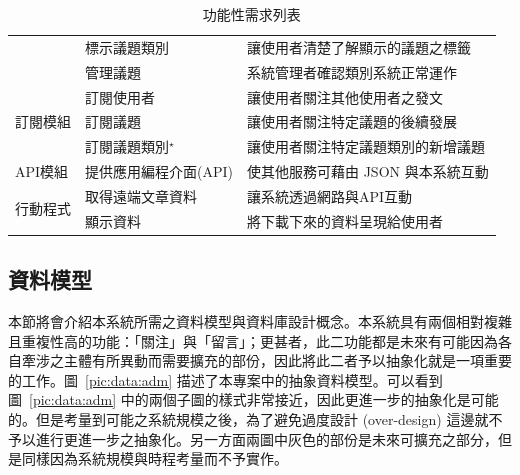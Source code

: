 \documentclass[12pt]{article}
\begin{document}
\begin{table}[t]
\begin{tabular}{ | l | l | l | }
& 標示議題類別 & 讓使用者清楚了解顯示的議題之標籤 \\
& 管理議題 & 系統管理者確認類別系統正常運作 \\ \hline
\multirow{3}{*}{訂閱模組}
& 訂閱使用者 & 讓使用者關注其他使用者之發文 \\
& 訂閱議題 & 讓使用者關注特定議題的後續發展 \\
& 訂閱議題類別$^\star$ & 讓使用者關注特定議題類別的新增議題 \\ \hline
\multirow{1}{*}{API模組}
& 提供應用編程介面(API) & 使其他服務可藉由 JSON 與本系統互動 \\ \hline
\multirow{2}{*}{行動程式}
& 取得遠端文章資料 & 讓系統透過網路與API互動 \\
& 顯示資料 & 將下載下來的資料呈現給使用者 \\ \hline
\end{tabular}
\caption{功能性需求列表}
\label{req}
\end{table}

\subsection{資料模型}

本節將會介紹本系統所需之資料模型與資料庫設計概念。本系統具有兩個相對複雜且重複性高的功能：「關注」與「留言」；更甚者，此二功能都是未來有可能因為各自牽涉之主體有所異動而需要擴充的部份，因此將此二者予以抽象化就是一項重要的工作。圖~\ref{pic:data:adm} 描述了本專案中的抽象資料模型。可以看到圖~\ref{pic:data:adm} 中的兩個子圖的樣式非常接近，因此更進一步的抽象化是可能的。但是考量到可能之系統規模之後，為了避免過度設計 (over-design) 這邊就不予以進行更進一步之抽象化。另一方面兩圖中灰色的部份是未來可擴充之部分，但是同樣因為系統規模與時程考量而不予實作。
\end{document}
